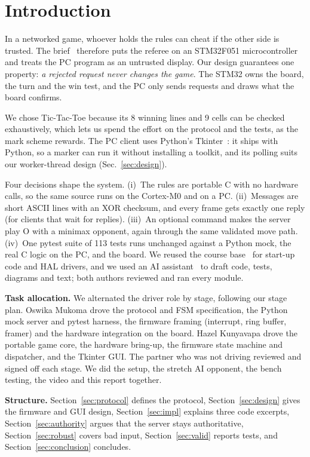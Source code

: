 \section{Introduction}
\label{sec:intro}

In a networked game, whoever holds the rules can cheat if the other side is trusted. The
brief~\cite{brief} therefore puts the referee on an STM32F051 microcontroller and treats the PC
program as an untrusted display. Our design guarantees one property: \emph{a rejected request
never changes the game}. The STM32 owns the board, the turn and the win test, and the PC only
sends requests and draws what the board confirms.

We chose Tic-Tac-Toe because its 8 winning lines and 9 cells can be checked exhaustively, which
lets us spend the effort on the protocol and the tests, as the mark scheme rewards. The PC client uses
Python's Tkinter~\cite{guilib}: it ships with Python, so a marker can run it without installing a
toolkit, and its  polling suits our worker-thread design (Sec.~\ref{sec:design}).

Four decisions shape the system. (i)~The rules are portable C with no hardware calls, so the same
source runs on the Cortex-M0 and on a PC. (ii)~Messages are short ASCII lines with an XOR checksum, and
every frame gets exactly one reply (for clients that wait for replies). (iii)~An optional  command makes the server play O with a minimax opponent, again through the same validated move path. (iv)~One pytest suite of 113 tests runs unchanged against a
Python mock, the real C logic on the PC, and the board. We reused the course
base~\cite{coursebase} for start-up code and HAL drivers, and we used an AI assistant~\cite{aiuse}
to draft code, tests, diagrams and text; both authors reviewed and ran every module.

\textbf{Task allocation.} We alternated the driver role by stage, following our stage plan. Oswika Mukoma drove the protocol and FSM specification, the Python mock server and pytest harness, the firmware framing (interrupt, ring buffer, framer) and the hardware integration on the board. Hazel Kunyavapa drove the portable game core, the hardware bring-up, the firmware state machine and dispatcher, and the Tkinter GUI. The partner who was not driving reviewed and signed off each stage. We did the setup, the stretch AI opponent, the bench testing, the video and this report together.

\textbf{Structure.} Section~\ref{sec:protocol} defines the protocol, Section~\ref{sec:design} gives the
firmware and GUI design, Section~\ref{sec:impl} explains three code excerpts,
Section~\ref{sec:authority} argues that the server stays authoritative,
Section~\ref{sec:robust} covers bad input, Section~\ref{sec:valid} reports tests, and
Section~\ref{sec:conclusion} concludes.
